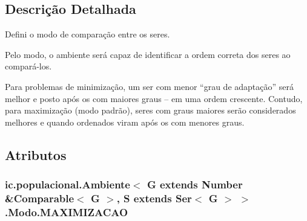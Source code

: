 \subsection{Descrição Detalhada}
Defini o modo de comparação entre os seres. 

Pelo modo, o ambiente será capaz de identificar a ordem correta dos seres ao compará-\/los.

Para problemas de minimização, um ser com menor “grau de adaptação” será melhor e posto após os com maiores graus – em uma ordem crescente. Contudo, para maximização (modo padrão), seres com graus maiores serão considerados melhores e quando ordenados viram após os com menores graus. 

\subsection{Atributos}
\hypertarget{enumic_1_1populacional_1_1_ambiente_3_01_g_01extends_01_number_01_6_comparable_3_01_g_01_4_00_0156fb2ffb0f78f5b655aaee5b0df471a7_aebd926ba90a2f0976426930757e52389}{
\subsubsection[{M\-A\-X\-I\-M\-I\-Z\-A\-C\-A\-O}]{\setlength{\rightskip}{0pt plus 5cm}ic.\-populacional.\-Ambiente$<$ G extends Number \&Comparable$<$ G $>$, S extends Ser$<$ G $>$ $>$.Modo.\-M\-A\-X\-I\-M\-I\-Z\-A\-C\-A\-O}}\label{enumic_1_1populacional_1_1_ambiente_3_01_g_01extends_01_number_01_6_comparable_3_01_g_01_4_00_0156fb2ffb0f78f5b655aaee5b0df471a7_aebd926ba90a2f0976426930757e52389}
